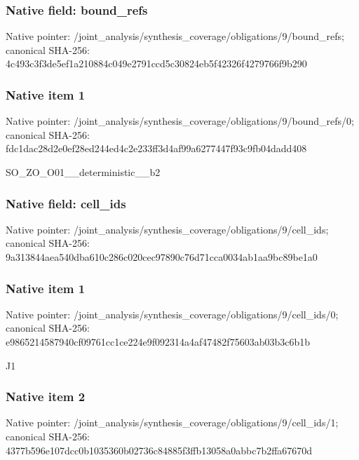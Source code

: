 \documentclass[10pt,a4paper]{article}
\begin{document}
\subsubsection{Native field: bound\_refs}


Native pointer: /joint\_analysis/synthesi\allowbreak{}s\_coverage/obligations/9\allowbreak{}/bound\_refs; canonical SHA-256: 4c493c3f3de5ef1a210884c0\allowbreak{}49e2791ccd5c30824eb5f423\allowbreak{}26f4279766f9b290



\subsubsection{Native item 1}


Native pointer: /joint\_analysis/synthesi\allowbreak{}s\_coverage/obligations/9\allowbreak{}/bound\_refs/0; canonical SHA-256: fdc1dac28d2e0ef28ed244ed\allowbreak{}4c2e233ff3d4af99a6277447\allowbreak{}f93c9fb04dadd408


SO\_ZO\_O01\_\_deterministic\_\_b2


\subsubsection{Native field: cell\_ids}


Native pointer: /joint\_analysis/synthesi\allowbreak{}s\_coverage/obligations/9\allowbreak{}/cell\_ids; canonical SHA-256: 9a313844aea540dba610c286\allowbreak{}c020cec97890c76d71cca003\allowbreak{}4ab1aa9bc89be1a0



\subsubsection{Native item 1}


Native pointer: /joint\_analysis/synthesi\allowbreak{}s\_coverage/obligations/9\allowbreak{}/cell\_ids/0; canonical SHA-256: e9865214587940cf09761cc1\allowbreak{}ce224e9f092314a4af47482f\allowbreak{}75603ab03b3c6b1b


J1


\subsubsection{Native item 2}


Native pointer: /joint\_analysis/synthesi\allowbreak{}s\_coverage/obligations/9\allowbreak{}/cell\_ids/1; canonical SHA-256: 4377b596e107dcc0b1035360\allowbreak{}b02736c84885f3ffb13058a0\allowbreak{}abbc7b2ffa67670d
\end{document}
